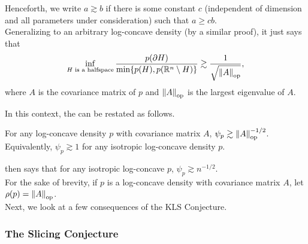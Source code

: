 	Henceforth, we write $a\gtrsim b$ if there is some constant $c$ (independent of dimension and all parameters under consideration) such that $a \geq c b$.\\
	Generalizing  to an arbitrary log-concave density (by a similar proof), it just says that
	\[ \inf_{H\text{ is a halfspace}} \frac{p(\partial H)}{\min\{p(H),p(\mathbb{R}^n\setminus H)\}} \gtrsim \frac{1}{\sqrt{\left\lVert A\right\rVert_{\text{op}}}}, \]
	where $A$ is the covariance matrix of $p$ and $\left\lVert A\right\rVert_{\text{op}}$ is the largest eigenvalue of $A$.

	In this context, the  can be restated as follows. 

	\begin{fcon}
		\label{con: kls conjecture reformulated}
		For any log-concave density $p$ with covariance matrix $A$, $\psi_p \gtrsim \left\lVert A\right\rVert_{\text{op}}^{-1/2}$. Equivalently, $\psi_p\gtrsim 1$ for any isotropic log-concave density $p$.
	\end{fcon}

	 then says that for any isotropic log-concave $p$, $\psi_p \gtrsim n^{-1/2}$.\\
	For the sake of brevity, if $p$ is a log-concave density with covariance matrix $A$, let $\rho(p) = \left\lVert A\right\rVert_{\text{op}}$.\\





	Next, we look at a few consequences of the KLS Conjecture.

	\subsubsection{The Slicing Conjecture}

